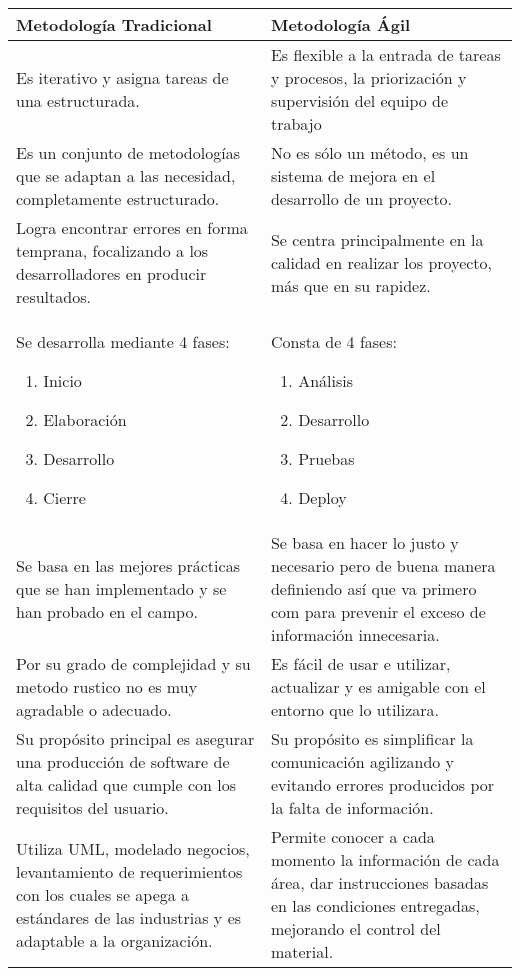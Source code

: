 \documentclass[a4paper,11pt]{report}
\begin{document}
\begin{center}
    \begin{tabular}{ | p{7cm} | p{7cm} |}
    \hline
    Metodología Tradicional & Metodología Ágil \\ \hline
    Es iterativo y asigna tareas de una estructurada. & Es flexible a la entrada de tareas y procesos, la priorización y supervisión del equipo de trabajo \\ \hline
    Es un conjunto de metodologías que se adaptan a las necesidad, completamente estructurado. & No es sólo un método, es un sistema de mejora en el desarrollo de un proyecto. \\ \hline
    Logra encontrar errores en forma temprana, focalizando a los desarrolladores en producir resultados. & Se centra principalmente en la calidad en realizar los proyecto, más que en su rapidez. \\ \hline
    Se desarrolla mediante 4 fases:
    \begin{enumerate}
        \item Inicio
        \item Elaboración
        \item Desarrollo
        \item Cierre
    \end{enumerate} & Consta de 4 fases:
    \begin{enumerate}
        \item Análisis
        \item Desarrollo
        \item Pruebas
        \item Deploy
    \end{enumerate} \\ \hline
    Se basa en las mejores prácticas que se han implementado y se han probado en el campo. & Se basa en hacer lo justo y necesario pero de buena manera definiendo así que va primero com para prevenir el exceso de información innecesaria. \\ \hline
    Por su grado de complejidad y su metodo rustico no es muy agradable o adecuado. & Es fácil de usar e utilizar, actualizar y es amigable con el entorno que lo utilizara. \\ \hline
    Su propósito principal es asegurar una producción de software de alta calidad que cumple con los requisitos del usuario. & Su propósito es simplificar la comunicación agilizando y evitando errores producidos por la falta de información. \\
    \hline
    Utiliza UML, modelado negocios, levantamiento de requerimientos con los cuales se apega a estándares de las industrias y es adaptable a la organización. & Permite conocer a cada momento la información de cada área, dar instrucciones basadas en las condiciones entregadas, mejorando el control del material.\\ \hline

\end{tabular}
\end{center}
\end{document}
